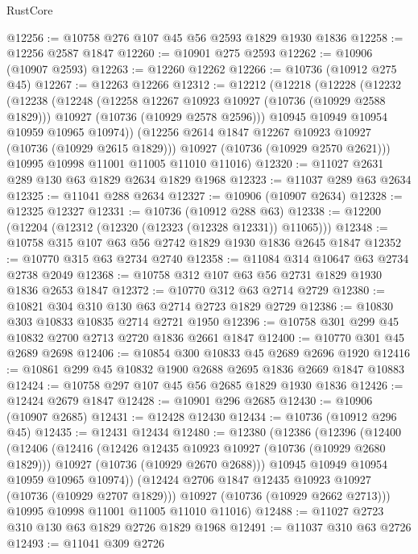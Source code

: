 \begin{lexlean}{RustCore}
\begin{coremodule}
@12256 := @10758 @276 @107 @45 @56 @2593 @1829 @1930 @1836
@12258 := @12256 @2587 @1847
@12260 := @10901 @275 @2593
@12262 := @10906 (@10907 @2593)
@12263 := @12260 @12262
@12266 := @10736 (@10912 @275 @45)
@12267 := @12263 @12266
@12312 := @12212
    (@12218
      (@12228
        (@12232
          (@12238
            (@12248
              (@12258 @12267 @10923 @10927 (@10736 (@10929 @2588 @1829)))
              @10927
              (@10736 (@10929 @2578 @2596)))
            @10945
            @10949
            @10954
            @10959
            @10965
            @10974))
        (@12256 @2614 @1847 @12267 @10923 @10927 (@10736 (@10929 @2615 @1829)))
        @10927
        (@10736 (@10929 @2570 @2621)))
      @10995
      @10998
      @11001
      @11005
      @11010
      @11016)
@12320 := @11027 @2631 @289 @130 @63 @1829 @2634 @1829 @1968
@12323 := @11037 @289 @63 @2634
@12325 := @11041 @288 @2634
@12327 := @10906 (@10907 @2634)
@12328 := @12325 @12327
@12331 := @10736 (@10912 @288 @63)
@12338 := @12200 (@12204 (@12312 (@12320 (@12323 (@12328 @12331)) @11065)))
@12348 := @10758 @315 @107 @63 @56 @2742 @1829 @1930 @1836 @2645 @1847
@12352 := @10770 @315 @63 @2734 @2740
@12358 := @11084 @314 @10647 @63 @2734 @2738 @2049
@12368 := @10758 @312 @107 @63 @56 @2731 @1829 @1930 @1836 @2653 @1847
@12372 := @10770 @312 @63 @2714 @2729
@12380 := @10821 @304 @310 @130 @63 @2714 @2723 @1829 @2729
@12386 := @10830 @303 @10833 @10835 @2714 @2721 @1950
@12396 := @10758 @301 @299 @45 @10832 @2700 @2713 @2720 @1836 @2661 @1847
@12400 := @10770 @301 @45 @2689 @2698
@12406 := @10854 @300 @10833 @45 @2689 @2696 @1920
@12416 := @10861 @299 @45 @10832 @1900 @2688 @2695 @1836 @2669 @1847 @10883
@12424 := @10758 @297 @107 @45 @56 @2685 @1829 @1930 @1836
@12426 := @12424 @2679 @1847
@12428 := @10901 @296 @2685
@12430 := @10906 (@10907 @2685)
@12431 := @12428 @12430
@12434 := @10736 (@10912 @296 @45)
@12435 := @12431 @12434
@12480 := @12380
    (@12386
      (@12396
        (@12400
          (@12406
            (@12416
              (@12426 @12435 @10923 @10927 (@10736 (@10929 @2680 @1829)))
              @10927
              (@10736 (@10929 @2670 @2688)))
            @10945
            @10949
            @10954
            @10959
            @10965
            @10974))
        (@12424 @2706 @1847 @12435 @10923 @10927 (@10736 (@10929 @2707 @1829)))
        @10927
        (@10736 (@10929 @2662 @2713)))
      @10995
      @10998
      @11001
      @11005
      @11010
      @11016)
@12488 := @11027 @2723 @310 @130 @63 @1829 @2726 @1829 @1968
@12491 := @11037 @310 @63 @2726
@12493 := @11041 @309 @2726

\end{coremodule}
\end{lexlean}

